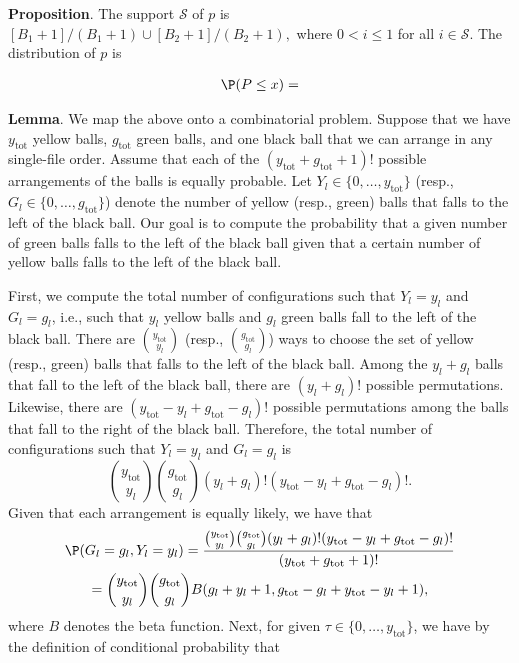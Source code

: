 \documentclass[12pt]{article}
\begin{document}
\textbf{Proposition}. The support $\mathcal{S}$ of $p$ is $[B_1 + 1]/(B_1 + 1) \cup [B_2 + 1]/(B_2 + 1),$ where $0 < i \leq 1$ for all $i \in \mathcal{S}$. The distribution of $p$ is

\begin{multline*}
\P(P \leq x) = 
\end{multline*}

\textbf{Lemma}. We map the above onto a combinatorial problem. Suppose that we have $y_\textrm{tot}$ yellow balls, $g_\textrm{tot}$ green balls, and one black ball that we can arrange in any single-file order. Assume that each of the $(y_\textrm{tot} + g_\textrm{tot} + 1)!$ possible arrangements of the balls is equally probable. Let $Y_l \in \{0, \dots, y_\textrm{tot}\}$ (resp., $G_l \in \{0, \dots, g_\textrm{tot}\} $) denote the number of yellow (resp., green) balls that falls to the left of the black ball. Our goal is to compute the probability that a given number of green balls falls to the left of the black ball given that a certain number of yellow balls falls to the left of the black ball.

First, we compute the total number of configurations such that $Y_l = y_l$ and $G_l = g_l$, i.e., such that $y_l$ yellow balls and $g_l$ green balls fall to the left of the black ball. There are $\binom{y_\textrm{tot}}{y_l}$ (resp., $\binom{g_\textrm{tot}}{g_l}$) ways to choose the set of yellow (resp., green) balls that falls to the left of the black ball. Among the $y_l + g_l$ balls that fall to the left of the black ball, there are $(y_l + g_l)!$ possible permutations. Likewise, there are $(y_\textrm{tot} - y_l + g_\textrm{tot} - g_l)!$ possible permutations among the balls that fall to the right of the black ball. Therefore, the total number of configurations such that $Y_l = y_l$ and $G_l = g_l$ is
$$ \binom{y_\textrm{tot}}{y_l} \binom{g_\textrm{tot}}{g_l} (y_l + g_l)! (y_\textrm{tot} - y_l + g_\textrm{tot} - g_l)!.$$ Given that each arrangement is equally likely, we have that
\begin{multline*}
\P(G_l = g_l, Y_l = y_l) = \frac{ \binom{y_\textrm{tot}}{y_l} \binom{g_\textrm{tot}}{g_l} (y_l + g_l)! (y_\textrm{tot} - y_l + g_\textrm{tot} - g_l)! }{( y_\textrm{tot} + g_\textrm{tot} + 1)! } \\ = \binom{y_\textrm{tot}}{y_l} \binom{g_\textrm{tot}}{g_l} B(g_l + y_l + 1, g_\textrm{tot} - g_l + y_\textrm{tot} - y_l + 1),
\end{multline*}
where $B$ denotes the beta function. Next, for given $\tau \in \{0, \dots, y_\textrm{tot}\}$, we have by the definition of conditional probability that
\end{document}
